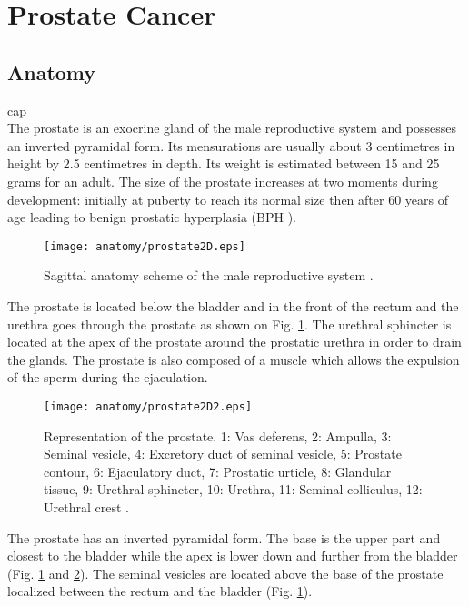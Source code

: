 \section{Prostate Cancer}\label{section:intro:prostatecancer}

\subsection{Anatomy}\label{subsection:intro:prostatecancer:anatomy}
\ac{cap}\\

The prostate is an exocrine gland of the male reproductive system and possesses an inverted pyramidal form. Its mensurations are usually about 3 centimetres in height by 2.5 centimetres in depth. Its weight is estimated between 15 and 25 grams for an adult. The size of the prostate increases at two moments during development: initially at puberty to reach its normal size then after 60 years of age leading to benign prostatic hyperplasia (BPH \g).

\begin{figure}
	\centering
	\texttt{[image: anatomy/prostate2D.eps]}
	\caption{Sagittal anatomy scheme of the male reproductive system \cite{Geckomedia2011}.}
	\label{fig:intro:prostatecancer:anatomy:anatomyProstate2D}
\end{figure}

The prostate is located below the bladder and in the front of the rectum and the urethra goes through the prostate as shown on Fig. \ref{fig:intro:prostatecancer:anatomy:anatomyProstate2D}. The urethral sphincter is located at the apex of the prostate around the prostatic urethra in order to drain the glands. The prostate is also composed of a muscle which allows the expulsion of the sperm during the ejaculation.

\begin{figure}
	\centering
	\texttt{[image: anatomy/prostate2D2.eps]}
	\caption{Representation of the prostate. 1: Vas deferens, 2: Ampulla, 3: Seminal vesicle, 4: Excretory duct of seminal vesicle, 5: Prostate contour, 6: Ejaculatory duct, 7: Prostatic urticle, 8: Glandular tissue, 9: Urethral sphincter, 10: Urethra, 11: Seminal colliculus, 12: Urethral crest \cite{Wikipedia2011}.}
	\label{fig:intro:prostatecancer:anatomy:anatomyProstate2D2}
\end{figure}

The prostate has an inverted pyramidal form. The base is the upper part and closest to the bladder while the apex is lower down and further from the bladder (Fig. \ref{fig:intro:prostatecancer:anatomy:anatomyProstate2D} and \ref{fig:intro:prostatecancer:anatomy:anatomyProstate2D2}). The seminal vesicles are located above the base of the prostate localized between the rectum and the bladder (Fig. \ref{fig:intro:prostatecancer:anatomy:anatomyProstate2D}).

